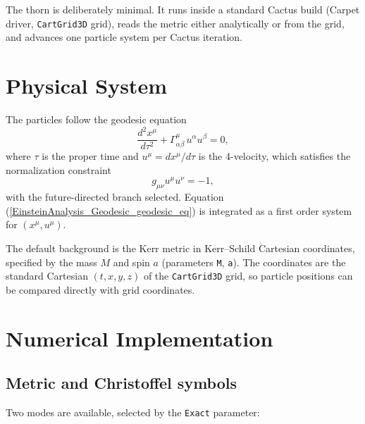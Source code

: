 \documentclass{article}
\begin{document}
The thorn is deliberately minimal.  It runs inside a standard Cactus
build (Carpet driver, \texttt{CartGrid3D} grid), reads the metric either
analytically or from the grid, and advances one particle system per
Cactus iteration.

\section{Physical System}

The particles follow the geodesic equation
\begin{equation}
\frac{d^2 x^\mu}{d\tau^2} + \Gamma^\mu_{\alpha\beta}
\, u^\alpha u^\beta = 0,
\label{EinsteinAnalysis_Geodesic_geodesic_eq}
\end{equation}
where $\tau$ is the proper time and
$u^\mu = dx^\mu/d\tau$ is the 4-velocity, which satisfies the
normalization constraint
\begin{equation}
g_{\mu\nu} u^\mu u^\nu = -1,
\label{EinsteinAnalysis_Geodesic_norm}
\end{equation}
with the future-directed branch selected.  Equation
(\ref{EinsteinAnalysis_Geodesic_geodesic_eq}) is integrated as a first
order system for $(x^\mu, u^\mu)$.

The default background is the Kerr metric in Kerr--Schild Cartesian
coordinates, specified by the mass $M$ and spin $a$ (parameters
\texttt{M}, \texttt{a}).  The coordinates are the standard Cartesian
$(t, x, y, z)$ of the \texttt{CartGrid3D} grid, so particle positions
can be compared directly with grid coordinates.

\section{Numerical Implementation}

\subsection{Metric and Christoffel symbols}

Two modes are available, selected by the \texttt{Exact} parameter:
\end{document}
